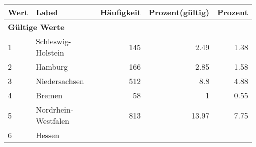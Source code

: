      \begin{longtable}{lXrrr}
     \toprule
     \textbf{Wert} & \textbf{Label} & \textbf{Häufigkeit} & \textbf{Prozent(gültig)} & \textbf{Prozent} \\
     \endhead
     \midrule
     \multicolumn{5}{l}{\textbf{Gültige Werte}}\\

     1 &
     \multicolumn{1}{X}{ Schleswig-Holstein   } &


       \num{145} &
       \num[round-mode=places,round-precision=2]{2,49} &
         \num[round-mode=places,round-precision=2]{1,38} \\

     2 &
     \multicolumn{1}{X}{ Hamburg   } &


       \num{166} &
       \num[round-mode=places,round-precision=2]{2,85} &
         \num[round-mode=places,round-precision=2]{1,58} \\

     3 &
     \multicolumn{1}{X}{ Niedersachsen   } &


       \num{512} &
       \num[round-mode=places,round-precision=2]{8,8} &
         \num[round-mode=places,round-precision=2]{4,88} \\

     4 &
     \multicolumn{1}{X}{ Bremen   } &


       \num{58} &
       \num[round-mode=places,round-precision=2]{1} &
         \num[round-mode=places,round-precision=2]{0,55} \\

     5 &
     \multicolumn{1}{X}{ Nordrhein-Westfalen   } &


       \num{813} &
       \num[round-mode=places,round-precision=2]{13,97} &
         \num[round-mode=places,round-precision=2]{7,75} \\

     6 &
     \multicolumn{1}{X}{ Hessen   } &



\end{longtable}
